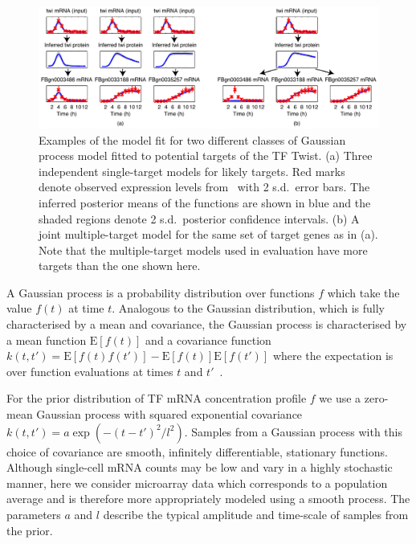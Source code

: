 \documentclass{pnastwo}
\begin{document}
\begin{article}
\begin{figure}[tb]
  \centering
  \includegraphics{fig1}
  \caption{Examples of the model fit for two different classes of 
    Gaussian process model fitted to potential targets of the TF Twist. (a) Three independent single-target models
    for likely targets. Red marks denote observed expression
    levels from~\cite{Tomancak2002} with 2 s.d.\ error bars.
    The inferred posterior means of the functions are shown in blue
    and the shaded regions denote 2 s.d.\ posterior confidence
    intervals. (b) A joint multiple-target model for
    the same set of target genes as in (a). Note that
    the multiple-target models used in evaluation have more targets
    than the one shown here.\label{fig:gpdisim_models}
}
\end{figure}

A Gaussian process is a probability distribution over
functions $f$ which take the value $f(t)$ at time
$t$. Analogous to the Gaussian distribution, which is fully
characterised by a mean and covariance, the Gaussian process is
characterised by a mean function $\mathrm{E}[f(t)]$ and a covariance
function $k(t,t')=\mathrm{E}[f(t)f(t')]-\mathrm{E}[f(t)]\mathrm{E}[f(t')]$
where the expectation is over function evaluations at times $t$ and
$t'$~\cite{Rasmussen2006}.

For the prior distribution of TF mRNA concentration profile $f$ we use a
zero-mean Gaussian process with squared exponential covariance
$k(t,t')=a\exp(-(t-t')^2/l^2)$. Samples from a Gaussian process with this choice
of covariance are smooth, infinitely differentiable, stationary functions. Although single-cell mRNA counts may be low
and vary in a highly stochastic manner, here we consider microarray data which
corresponds to a population average and is therefore more
appropriately modeled using a smooth process. The parameters $a$ and
$l$ describe the typical amplitude and time-scale of samples from
the prior. 


\end{article}
\end{document}
